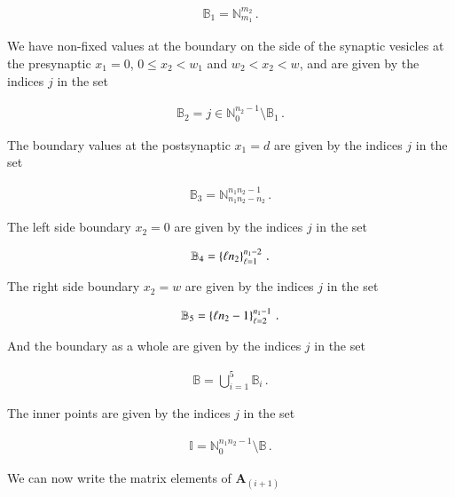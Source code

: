 \documentclass[11pt,english,a4paper]{article}
\begin{document}
\begin{flushleft}
\begin{align*}
\mathbb{B}_1 = \mathbb{N}_{m_1}^{m_2}\,.
\end{align*}

We have non-fixed values at the boundary on the side of the synaptic vesicles at the presynaptic $x_1=0$, $0 \leq x_2 < w_1$ and $w_2 < x_2 < w$, and are given by the indices $j$ in the set

\begin{align*}
\mathbb{B}_2 = j\in\mathbb{N}_0^{n_2-1} \setminus \mathbb{B}_1 \,.
\end{align*}

The boundary values at the postsynaptic $x_1=d$ are given by the indices $j$ in the set

\begin{align*}
\mathbb{B}_3 = \mathbb{N}_{n_1 n_2 - n_2}^{n_1 n_2 - 1} \,.
\end{align*}

The left side boundary $x_2=0$ are given by the indices $j$ in the set

\begin{align*}
\mathbb{B}_4 = \left\lbrace{\ell n_2}\right\rbrace_{\ell=1}^{n_1-2} \,.
\end{align*}

The right side boundary $x_2=w$ are given by the indices $j$ in the set

\begin{align*}
\mathbb{B}_5 = \left\lbrace{\ell n_2 - 1}\right\rbrace_{\ell=2}^{n_1-1}\,.
\end{align*}

And the boundary as a whole are given by the indices $j$ in the set

\begin{align*}
\mathbb{B} = \bigcup_{i=1}^5 \mathbb{B}_i \,.
\end{align*}

The inner points are given by the indices $j$ in the set

\begin{align*}
\mathbb{I} = \mathbb{N}_{0}^{n_1 n_2 -1} \setminus \mathbb{B}\,.
\end{align*}

We can now write the matrix elements of $\textbf{A}_{(i+1)}$


\end{flushleft}
\end{document}
